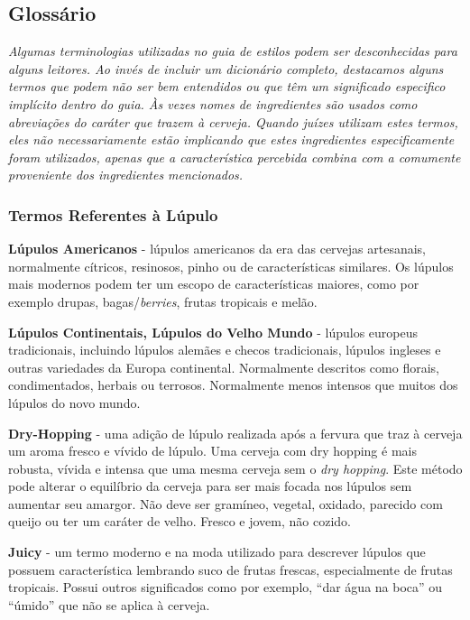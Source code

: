 \subsection*{Glossário}
\textit{Algumas terminologias utilizadas no guia de estilos podem ser desconhecidas para alguns leitores. Ao invés de incluir um dicionário completo, destacamos alguns termos que podem não ser bem entendidos ou que têm um significado especifico implícito dentro do guia. Às vezes nomes de ingredientes são usados como abreviações do caráter que trazem à cerveja. Quando juízes utilizam estes termos, eles não necessariamente estão implicando que estes ingredientes especificamente foram utilizados, apenas que a característica percebida combina com a comumente proveniente dos ingredientes mencionados.}
\subsubsection*{Termos Referentes à Lúpulo}
\textbf{Lúpulos Americanos} - lúpulos americanos da era das cervejas artesanais, normalmente cítricos, resinosos, pinho ou de características similares. Os lúpulos mais modernos podem ter um escopo de características maiores, como por exemplo drupas, bagas/\textit{berries}, frutas tropicais e melão.

\textbf{Lúpulos Continentais, Lúpulos do Velho Mundo} - lúpulos europeus tradicionais, incluindo lúpulos alemães e checos tradicionais, lúpulos ingleses e outras variedades da Europa continental. Normalmente descritos como florais, condimentados, herbais ou terrosos. Normalmente menos intensos que muitos dos lúpulos do novo mundo.

\textbf{Dry-Hopping} - uma adição de lúpulo realizada após a fervura que traz à cerveja um aroma fresco e vívido de lúpulo. Uma cerveja com dry hopping é mais robusta, vívida e intensa que uma mesma cerveja sem o \textit{dry hopping}. Este método pode alterar o equilíbrio da cerveja para ser mais focada nos lúpulos sem aumentar seu amargor. Não deve ser gramíneo, vegetal, oxidado, parecido com queijo ou ter um caráter de velho. Fresco e jovem, não cozido.

\textbf{Juicy} - um termo moderno e na moda utilizado para descrever lúpulos que possuem característica lembrando suco de frutas frescas, especialmente de frutas tropicais. Possui outros significados como por exemplo, “dar água na boca” ou “úmido” que não se aplica à cerveja.


